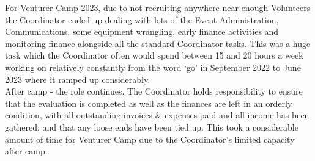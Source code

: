 For Venturer Camp 2023, due to not recruiting anywhere near enough Volunteers the Coordinator ended up dealing with lots of the Event Administration, Communications, some equipment wrangling, early finance activities and monitoring finance alongside all the standard Coordinator tasks. This was a huge task which the Coordinator often would spend between 15 and 20 hours a week working on relatively constantly from the word `go' in September 2022 to June 2023 where it ramped up considerably.\\

After camp - the role continues. The Coordinator holds responsibility to ensure that the evaluation is completed as well as the finances are left in an orderly condition, with all outstanding invoices \& expenses paid and all income has been gathered; and that any loose ends have been tied up. This took a considerable amount of time for Venturer Camp due to the Coordinator's limited capacity after camp.
